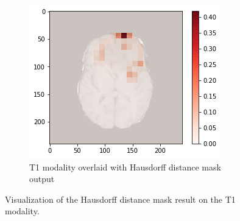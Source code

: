 \begin{figure}[H]
\begin{subfigure}{.33\textwidth}
    \end{subfigure}
        \begin{subfigure}{.33\textwidth}
        \centering
        \includegraphics[width=\linewidth]{chapters/07_brats3d/images/09_t1_hdm10.png}
        \caption{T1 modality overlaid with Hausdorff distance mask output}
    \end{subfigure}
    \caption{Visualization of the Hausdorff distance mask result on the T1 modality.}
    \label{brats3d_t1}
\end{figure}

